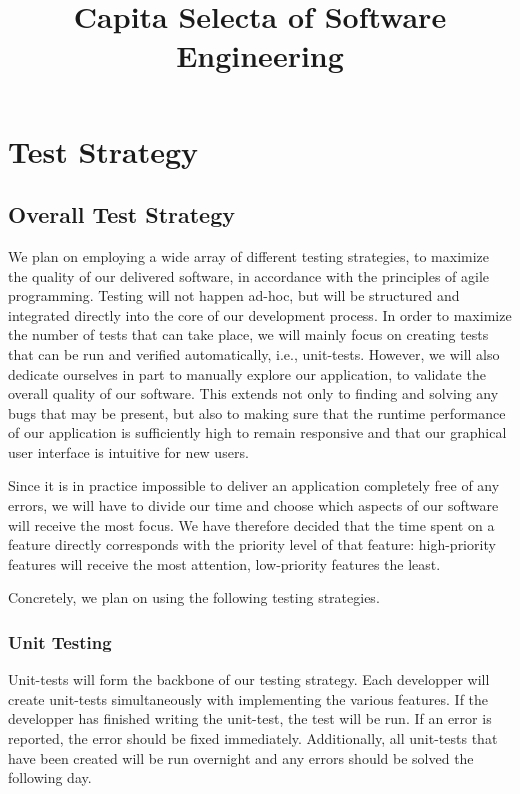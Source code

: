 \documentclass {article}
\title {Capita Selecta of Software Engineering}
\begin{document}
\maketitle
 
\section{Test Strategy}

\subsection{Overall Test Strategy}
We plan on employing a wide array of different testing strategies, to maximize the quality of our delivered software, in accordance with the principles of agile programming. Testing will not happen ad-hoc, but will be structured and integrated directly into the core of our development process.
In order to maximize the number of tests that can take place, we will mainly focus on creating tests that can be run and verified automatically, i.e., unit-tests.
However, we will also dedicate ourselves in part to manually explore our application, to validate the overall quality of our software. This extends not only to finding and solving any bugs that may be present, but also to making sure that the runtime performance of our application is sufficiently high to remain responsive and that our graphical user interface is intuitive for new users.

Since it is in practice impossible to deliver an application completely free of any errors, we will have to divide our time and choose which aspects of our software will receive the most focus. We have therefore decided that the time spent on a feature directly corresponds with the priority level of that feature: high-priority features will receive the most attention, low-priority features the least.

Concretely, we plan on using the following testing strategies.

\subsubsection{Unit Testing}
Unit-tests will form the backbone of our testing strategy. Each developper will create unit-tests simultaneously with implementing the various features.
If the developper has finished writing the unit-test, the test will be run. If an error is reported, the error should be fixed immediately.
Additionally, all unit-tests that have been created will be run overnight and any errors should be solved the following day.
\end{document}
